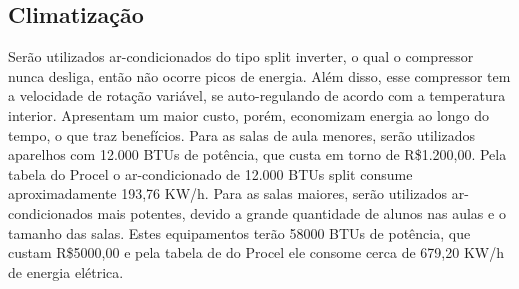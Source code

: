 \subsection{Climatização}

Serão utilizados ar-condicionados do tipo split inverter, o qual o compressor nunca desliga, então não ocorre picos de energia. Além disso, esse compressor tem a velocidade de rotação variável, se auto-regulando de acordo com a temperatura interior. Apresentam um maior custo, porém, economizam energia ao longo do tempo, o que traz benefícios.
Para as salas de aula menores, serão utilizados aparelhos com 12.000 BTUs de potência, que custa em torno de R\$1.200,00. Pela tabela do Procel o ar-condicionado de 12.000 BTUs split consume aproximadamente 193,76 KW/h.
Para as salas maiores, serão utilizados ar-condicionados mais potentes, devido a grande quantidade de alunos nas aulas e o tamanho das salas. Estes equipamentos terão 58000 BTUs de potência, que custam R\$5000,00 e pela tabela de do Procel ele consome cerca de 679,20 KW/h de energia elétrica.

